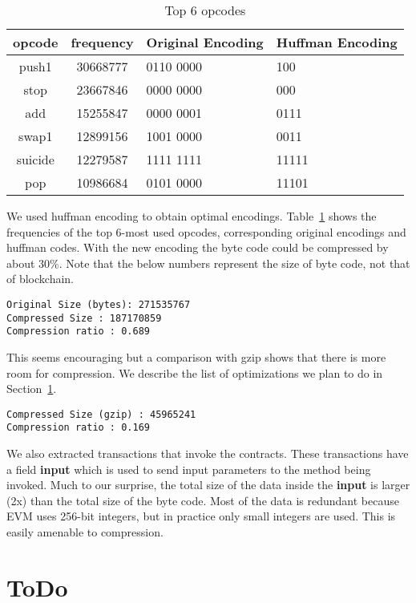 \documentclass[12pt]{article}
\begin{document}
\begin{table}[H]
\centering
\begin{tabular}{c | c | p{4cm} | p{4cm} }
	opcode & frequency & {Original Encoding} & {Huffman Encoding}  \\
\hline
push1 & 30668777 & 0110 0000 & 100\\
stop & 23667846 & 0000 0000 & 000 \\
add  & 15255847 & 0000 0001  & 0111\\
swap1  & 12899156 &1001 0000 & 0011 \\
suicide & 12279587 &1111 1111 & 11111 \\
pop    & 10986684 &0101 0000 & 11101 \\
\hline
\end{tabular}
\caption{Top 6 opcodes}
\label{tab:freqopcodes}
\end{table}

We used huffman encoding to obtain optimal encodings.
Table~\ref{tab:freqopcodes} shows the frequencies of the top 6-most used opcodes, corresponding original encodings and huffman codes.
With the new encoding the byte code could be compressed by about $30\%$. 
Note that the below numbers represent the size of byte code, not that of blockchain.

\begin{lstlisting}
Original Size (bytes): 271535767
Compressed Size : 187170859
Compression ratio : 0.689
\end{lstlisting}

This seems encouraging but a comparison with gzip shows that there is more room for compression. We describe the list of optimizations we plan to
do in Section~\ref{sec:todo}.
\begin{lstlisting}
Compressed Size (gzip) : 45965241
Compression ratio : 0.169
\end{lstlisting}

We also extracted transactions that invoke the contracts. 
These transactions have a field \textbf{input} which is used to send input parameters to the method being invoked.
Much to our surprise, the total size of the data inside the \textbf{input} is larger (2x) 
than the total size of the byte code. Most of the data is redundant because EVM uses 256-bit integers, but in practice only small integers are used.
This is easily amenable to compression.

\section{ToDo}\label{sec:todo}
\end{document}
